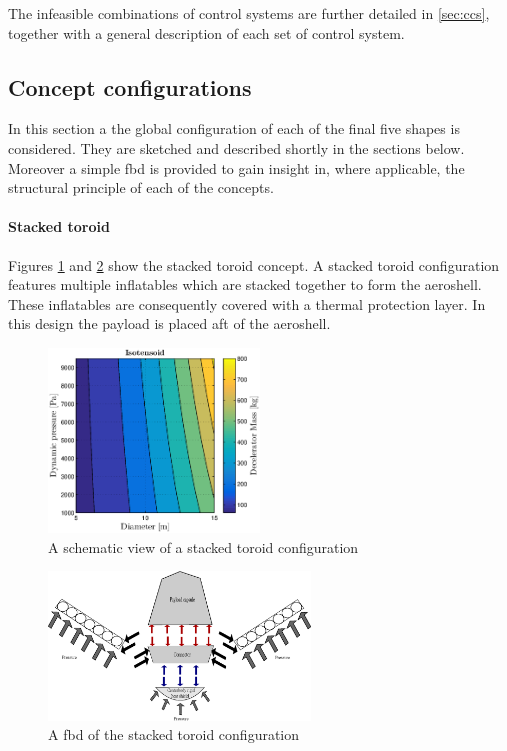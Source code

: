  The infeasible combinations of control systems are further detailed in \ref{sec:ccs}, together with a general description of each set of control system. 

\subsection{Concept configurations} \label{sec:conf}
In this section a the global configuration of each of the final five shapes is considered. They are sketched and described shortly in the sections below. Moreover a simple \gls{fbd} is provided to gain insight in, where applicable, the structural principle of each of the concepts.

\paragraph{Stacked toroid}

Figures \ref{fig:conc_stacked} and \ref{fig:fbd_stacked} show the stacked toroid concept. A stacked toroid configuration features multiple inflatables which are stacked together to form the aeroshell. These inflatables are consequently covered with a thermal protection layer. In this design the payload is placed aft of the aeroshell.\

\begin{figure}[H]
\centering
\includegraphics[width = 0.5\textwidth]{Figure/ISO_comp.eps}
\caption{A schematic view of a stacked toroid configuration}
\label{fig:conc_stacked}
\end{figure}

\begin{figure}[H]
\centering
\includegraphics[width = 0.62\textwidth]{Figure/FBD_stacked.eps}
\caption{A \gls{fbd} of the stacked toroid configuration}
\label{fig:fbd_stacked}
\end{figure}

